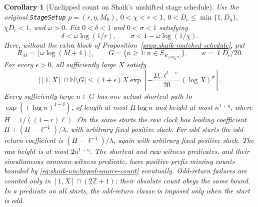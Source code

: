 \documentclass[11pt]{article}
\newtheorem{corollary}[proposition]{Corollary}
\theoremstyle{remark}\newtheorem{remark}[proposition]{Remark}
\newcommand{\NN}{\mathbb N}
\begin{document}
\begin{corollary}[Unclipped count on Shaik's unshifted stage schedule]
\label{cor:shaik-unclipped-source-count}
Use the original \texttt{StageSetup} \(p=(r,\eta,M_0)\),
\(0<\chi<r<1\), \(0<D_c\le\min\{1,D_\eta\}\),
\(\chi D_c<1\), and \(\omega>0\).
Fix \(0<\delta<1\) and \(0<\sigma<1\) satisfying
\[
 \delta<\omega\log(1/r),\qquad
 \sigma<1-\omega\log(1/\chi).
\]
Here, without the extra block of Proposition~\ref{prop:shaik-matched-schedule},
put
\[
 R_M=\lfloor\omega\log(M+4)\rfloor,\qquad
 G=\{n\ge1:n\in S_{R_{\lfloor\log_2n\rfloor}}\},\qquad
 \kappa=\ell D_c/20 .
\]
For every \(\epsilon>0\), all sufficiently large \(X\) satisfy
\begin{equation}\label{eq:shaik-unclipped-source-count}
 |[1,X]\cap\NN\setminus G|
 \le(4+\epsilon)X
       \exp\left[-\frac{D_c\ell^{1-\sigma}}{20}
                         (\log X)^\sigma\right].
\end{equation}
Every sufficiently large \(n\in G\) has one actual shortcut path
to \(\exp((\log n)^{1-\delta})\), of length at most
\(H\log n\) and height at most \(n^{1+\eta}\),
where \(H=1/((1-r)\ell)\).
On the same starts the raw clock has leading coefficient
\(H+(H-\ell^{-1})/\lambda\), with arbitrary fixed positive slack.
For odd starts the odd-return coefficient is
\((H-\ell^{-1})/\lambda\), again with arbitrary fixed positive slack.
The raw height is at most \(2n^{1+\eta}\).
The shortcut and raw witness predicates, and their simultaneous
common-witness predicate, have positive-prefix missing counts bounded
by \eqref{eq:shaik-unclipped-source-count} eventually.
Odd-return failures are counted only in \([1,X]\cap(2\mathbb Z+1)\);
their absolute count obeys the same bound. In a predicate on all starts,
the odd-return clause is imposed only when the start is odd.
\end{corollary}
\end{document}
